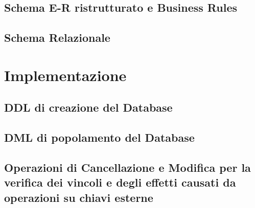 \documentclass[12pt]{extarticle}
\begin{document}
\subsection{Schema E-R ristrutturato e Business Rules}

\subsection{Schema Relazionale}

\section{Implementazione}
\subsection{DDL di creazione del Database}

\subsection{DML di popolamento del Database}

\subsection{Operazioni di Cancellazione e Modifica per la verifica dei vincoli e degli effetti causati da operazioni su chiavi esterne}
\end{document}
